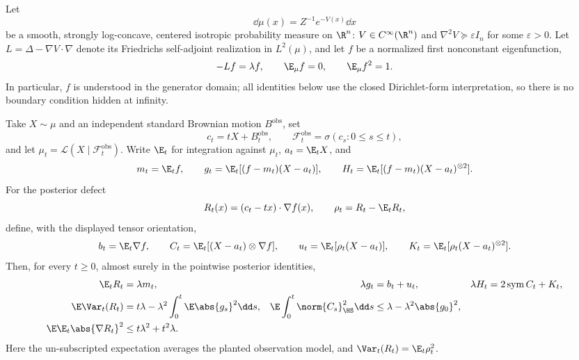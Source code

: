 \documentclass[../main.tex]{subfiles}
\begin{document}
\begin{theorem}[= Lemma~\ref{lem:mm-posterior-defect}]
\label{thm:sol-lem-mm-posterior-defect}
Let
\[
  \dd\mu(x)=Z^{-1}e^{-V(x)}\dd x
\]
be a smooth, strongly log-concave, centered isotropic probability measure on $\R^n$:
$V\in C^\infty(\R^n)$ and $\nabla^2V\succeq\varepsilon I_n$ for some $\varepsilon>0$.
Let $L=\Delta-\nabla V\cdot\nabla$ denote its Friedrichs self-adjoint realization in
$L^2(\mu)$, and let $f$ be a normalized first nonconstant eigenfunction,
\[
  -Lf=\lambda f,
  \qquad \E_\mu f=0,
  \qquad \E_\mu f^2=1.
\]
In particular, $f$ is understood in the generator domain; all identities below use the
closed Dirichlet-form interpretation, so there is no boundary condition hidden at infinity.

Take $X\sim\mu$ and an independent standard Brownian motion $B^{\mathrm{obs}}$, set
\[
  c_t=tX+B_t^{\mathrm{obs}},
  \qquad
  \mathcal F_t^{\mathrm{obs}}=\sigma(c_s:0\le s\le t),
\]
and let $\mu_t=\mathcal L(X\mid\mathcal F_t^{\mathrm{obs}})$.  Write $\E_t$ for integration
against $\mu_t$, $a_t=\E_tX$, and
\[
  m_t=\E_tf,
  \qquad
  g_t=\E_t[(f-m_t)(X-a_t)],
  \qquad
  H_t=\E_t[(f-m_t)(X-a_t)^{\otimes2}].
\]
For the posterior defect
\[
  R_t(x)=(c_t-tx)\cdot\nabla f(x),
  \qquad
  \rho_t=R_t-\E_tR_t,
\]
define, with the displayed tensor orientation,
\[
  b_t=\E_t\nabla f,
  \qquad
  C_t=\E_t[(X-a_t)\otimes\nabla f],
  \qquad
  u_t=\E_t[\rho_t(X-a_t)],
  \qquad
  K_t=\E_t[\rho_t(X-a_t)^{\otimes2}].
\]
Then, for every $t\ge0$, almost surely in the pointwise posterior identities,
\begin{align}
  \E_tR_t&=\lambda m_t,
  &\lambda g_t&=b_t+u_t,
  &\lambda H_t&=2\operatorname{sym}C_t+K_t,
  \label{eq:sol-mm-defect-identities}\\
  \E\Var_t(R_t)
  &=t\lambda-\lambda^2\int_0^t\E\abs{g_s}^2\dd s,
  &\E\int_0^t\norm{C_s}_{\HS}^2\dd s
  &\le \lambda-\lambda^2\abs{g_0}^2,
  \label{eq:sol-mm-defect-budgets}\\
  \E\E_t\abs{\nabla R_t}^2
  &\le t\lambda^2+t^2\lambda.
  \label{eq:sol-mm-defect-gradient}
\end{align}
Here the un-subscripted expectation averages the planted observation model, and
$\Var_t(R_t)=\E_t\rho_t^2$.
\end{theorem}
\end{document}
